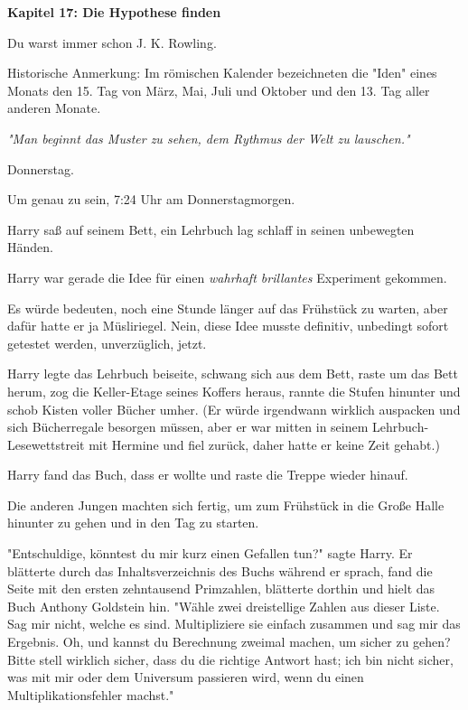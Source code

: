 

\hypertarget{die-hypothese-finden}{%

\textbf{Kapitel 17: Die Hypothese finden}

Du warst immer schon J. K. Rowling.

Historische Anmerkung: Im römischen Kalender bezeichneten die "Iden" eines Monats den 15. Tag von März, Mai, Juli und Oktober und den 13. Tag aller anderen Monate.

\later

\emph{"Man beginnt das Muster zu sehen, dem Rythmus der Welt zu lauschen."}

\later

Donnerstag.

Um genau zu sein, 7:24 Uhr am Donnerstagmorgen.

Harry saß auf seinem Bett, ein Lehrbuch lag schlaff in seinen unbewegten Händen.

Harry war gerade die Idee für einen \emph{wahrhaft brillantes} Experiment gekommen.

Es würde bedeuten, noch eine Stunde länger auf das Frühstück zu warten, aber dafür hatte er ja Müsliriegel. Nein, diese Idee musste definitiv, unbedingt sofort getestet werden, unverzüglich, jetzt.

Harry legte das Lehrbuch beiseite, schwang sich aus dem Bett, raste um das Bett herum, zog die Keller-Etage seines Koffers heraus, rannte die Stufen hinunter und schob Kisten voller Bücher umher. (Er würde irgendwann wirklich auspacken und sich Bücherregale besorgen müssen, aber er war mitten in seinem Lehrbuch-Lesewettstreit mit Hermine und fiel zurück, daher hatte er keine Zeit gehabt.)

Harry fand das Buch, dass er wollte und raste die Treppe wieder hinauf.

Die anderen Jungen machten sich fertig, um zum Frühstück in die Große Halle hinunter zu gehen und in den Tag zu starten.

"Entschuldige, könntest du mir kurz einen Gefallen tun?" sagte Harry. Er blätterte durch das Inhaltsverzeichnis des Buchs während er sprach, fand die Seite mit den ersten zehntausend Primzahlen, blätterte dorthin und hielt das Buch Anthony Goldstein hin. "Wähle zwei dreistellige Zahlen aus dieser Liste. Sag mir nicht, welche es sind. Multipliziere sie einfach zusammen und sag mir das Ergebnis. Oh, und kannst du Berechnung zweimal machen, um sicher zu gehen? Bitte stell wirklich sicher, dass du die richtige Antwort hast; ich bin nicht sicher, was mit mir oder dem Universum passieren wird, wenn du einen Multiplikationsfehler machst."

}
